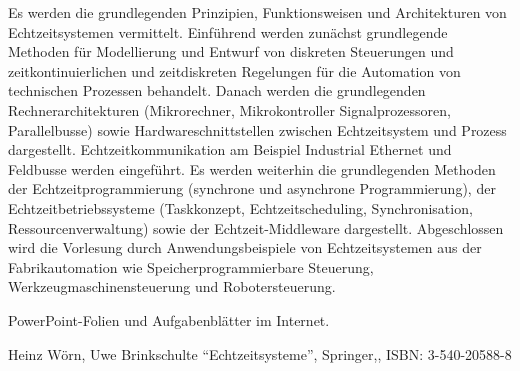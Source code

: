 \begin{course}
\begin{content}
Es werden die grundlegenden Prinzipien, Funktionsweisen und Architekturen von Echtzeitsystemen vermittelt. Einführend werden zunächst grundlegende Methoden für Modellierung und Entwurf von diskreten Steuerungen und zeitkontinuierlichen und zeitdiskreten Regelungen für die Automation von technischen Prozessen behandelt. Danach werden die grundlegenden Rechnerarchitekturen (Mikrorechner, Mikrokontroller Signalprozessoren, Parallelbusse) sowie Hardwareschnittstellen zwischen Echtzeitsystem und Prozess dargestellt. Echtzeitkommunikation am Beispiel Industrial Ethernet und Feldbusse werden eingeführt. Es werden weiterhin die grundlegenden Methoden der Echtzeitprogrammierung (synchrone und asynchrone Programmierung), der Echtzeitbetriebssysteme (Taskkonzept, Echtzeitscheduling, Synchronisation, Ressourcenverwaltung) sowie der Echtzeit-Middleware dargestellt. Abgeschlossen wird die Vorlesung durch Anwendungsbeispiele von Echtzeitsystemen aus der Fabrikautomation wie Speicherprogrammierbare Steuerung, Werkzeugmaschinensteuerung und Robotersteuerung.


\end{content}

\begin{media}PowerPoint-Folien und Aufgabenblätter im Internet.

\end{media}

\begin{literature}Heinz Wörn, Uwe Brinkschulte “Echtzeitsysteme”, Springer,, ISBN: 3-540-20588-8

\end{literature}



\end{course}